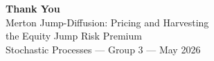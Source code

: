 \documentclass[aspectratio=169,10pt]{beamer}
\begin{document}
{
\begin{frame}[plain]
\begin{center}
  \vspace{1.8cm}
  {\Large\bfseries\color{darkblue} Thank You}\\[0.8cm]
  {\normalsize Merton Jump-Diffusion: Pricing and Harvesting\\
   the Equity Jump Risk Premium}\\[0.6cm]
  {\small Stochastic Processes --- Group 3 --- May 2026}
\end{center}
\end{frame}
}
\end{document}
